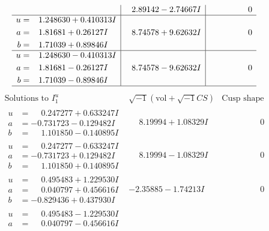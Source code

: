 \documentclass[1p]{elsarticle_modified}
\theoremstyle{definition}
\newcommand{\I}{\sqrt{-1}}
\begin{document}
$$\begin{array}{c|c|c}
 & \phantom{-}2.89142 - 2.74667 I & \phantom{-0.000000 } 0 \\ \hline\begin{aligned}
u &= \phantom{-}1.248630 + 0.410313 I \\
a &= \phantom{-}1.81681 + 0.26127 I \\
b &= \phantom{-}1.71039 + 0.89846 I\end{aligned}
 & \phantom{-}8.74578 + 9.62632 I & \phantom{-0.000000 } 0 \\ \hline\begin{aligned}
u &= \phantom{-}1.248630 - 0.410313 I \\
a &= \phantom{-}1.81681 - 0.26127 I \\
b &= \phantom{-}1.71039 - 0.89846 I\end{aligned}
 & \phantom{-}8.74578 - 9.62632 I & \phantom{-0.000000 } 0\\
 \hline 
 \end{array}$$\newpage$$\begin{array}{c|c|c}  
\text{Solutions to }I^u_{1}& \I (\text{vol} + \sqrt{-1}CS) & \text{Cusp shape}\\
 \hline 
\begin{aligned}
u &= \phantom{-}0.247277 + 0.633247 I \\
a &= -0.731723 - 0.129482 I \\
b &= \phantom{-}1.101850 - 0.140895 I\end{aligned}
 & \phantom{-}8.19994 + 1.08329 I & \phantom{-0.000000 } 0 \\ \hline\begin{aligned}
u &= \phantom{-}0.247277 - 0.633247 I \\
a &= -0.731723 + 0.129482 I \\
b &= \phantom{-}1.101850 + 0.140895 I\end{aligned}
 & \phantom{-}8.19994 - 1.08329 I & \phantom{-0.000000 } 0 \\ \hline\begin{aligned}
u &= \phantom{-}0.495483 + 1.229530 I \\
a &= \phantom{-}0.040797 + 0.456616 I \\
b &= -0.829436 + 0.437930 I\end{aligned}
 & -2.35885 - 1.74213 I & \phantom{-0.000000 } 0 \\ \hline\begin{aligned}
u &= \phantom{-}0.495483 - 1.229530 I \\
a &= \phantom{-}0.040797 - 0.456616 I \\

\end{aligned}
\end{array}$$
\end{document}
